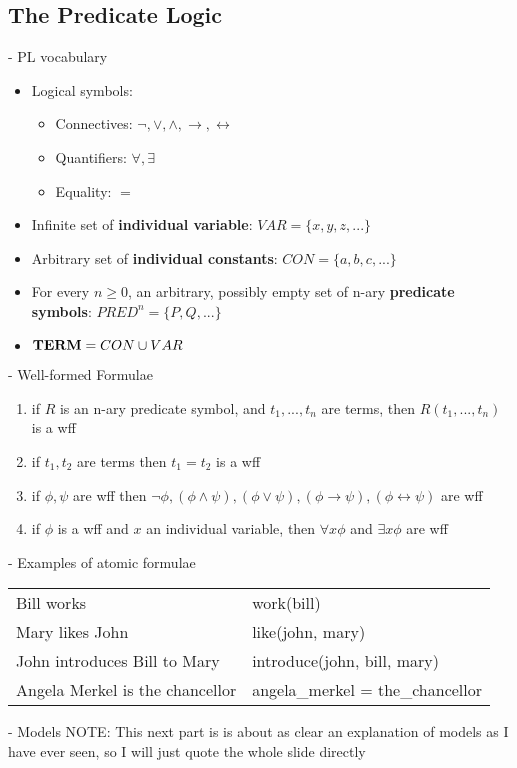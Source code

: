 \documentclass[11pt]{article}
\begin{document}
\subsection{The Predicate Logic}
- PL vocabulary
\begin{itemize}
 \item Logical symbols:
\begin{itemize}
 \item Connectives: $\neg, \vee, \wedge, \rightarrow, \leftrightarrow$
 \item Quantifiers: $\forall, \exists$
 \item Equality: $=$
\end{itemize}
 \item Infinite set of {\bf individual variable}: $VAR = \{x, y, z, ...\}$
 \item Arbitrary set of {\bf individual constants}: $CON = \{a, b, c,...\}$
 \item For every $n \geq 0$, an arbitrary, possibly empty set of n-ary {\bf predicate symbols}: $PRED^n = \{P, Q, ...\}$ 
 \item ${\bf TERM} = CON \cup VAR$
\end{itemize}
- Well-formed Formulae
\begin{enumerate}
 \item if $R$ is an n-ary predicate symbol, and $t_1 , ..., t_n$ are terms, then $R(t_1 , ..., t_n )$ is a wff
 \item if $t_1 , t_2$ are terms then $t_1 = t_2$ is a wff
 \item if $\phi, \psi$ are wff then $\neg\phi, (\phi\wedge\psi), (\phi\vee\psi), (\phi\rightarrow\psi), (\phi\leftrightarrow\psi)$ are wff
 \item if $\phi$ is a wff and $x$ an individual variable, then $\forall x\phi$ and $\exists x\phi$ are wff
\end{enumerate}
- Examples of atomic formulae
\begin{center}
\begin{tabular}{ll}
Bill works & work(bill)\\
Mary likes John & like(john, mary)\\
John introduces Bill to Mary & introduce(john, bill, mary)\\
Angela Merkel is the chancellor & angela\_merkel = the\_chancellor
\end{tabular}
\end{center}
- Models 
NOTE: This next part is is about as clear an explanation of models as I have ever seen, so I will just quote the whole slide directly 
\end{document}
